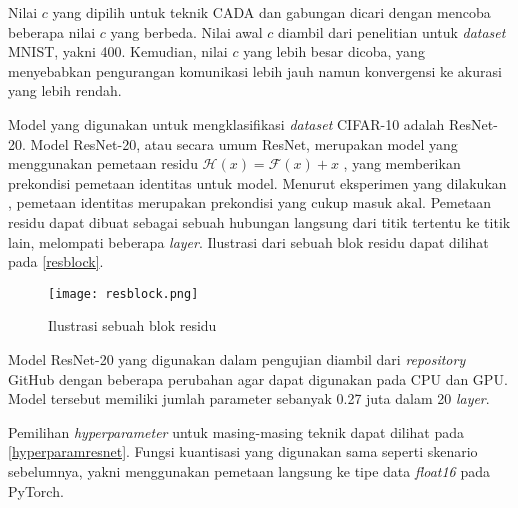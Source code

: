 Nilai $c$ yang dipilih untuk teknik CADA dan gabungan dicari dengan mencoba beberapa nilai $c$ yang berbeda. Nilai awal $c$ diambil dari penelitian \textcite{Chen2021CADA} untuk \emph{dataset} MNIST, yakni 400. Kemudian, nilai $c$ yang lebih besar dicoba, yang menyebabkan pengurangan komunikasi lebih jauh namun konvergensi ke akurasi yang lebih rendah.


Model yang digunakan untuk mengklasifikasi \emph{dataset} CIFAR-10 adalah ResNet-20. Model ResNet-20, atau secara umum ResNet, merupakan model yang menggunakan pemetaan residu $\mathcal{H}(x) = \mathcal{F}(x) + x$ \parencite{he2015deep}, yang memberikan prekondisi pemetaan identitas untuk model. Menurut eksperimen yang dilakukan \textcite{he2015deep}, pemetaan identitas merupakan prekondisi yang cukup masuk akal. Pemetaan residu dapat dibuat sebagai sebuah hubungan langsung dari titik tertentu ke titik lain, melompati beberapa \emph{layer}. Ilustrasi dari sebuah blok residu dapat dilihat pada \autoref{resblock}.

\begin{figure}[htb]
  \centering
  \texttt{[image: resblock.png]}
  \caption{Ilustrasi sebuah blok residu \parencite{he2015deep}}\label{resblock}
\end{figure}

Model ResNet-20 yang digunakan dalam pengujian diambil dari \emph{repository} GitHub \cite{Idelbayev18a} dengan beberapa perubahan agar dapat digunakan pada CPU dan GPU. Model tersebut memiliki jumlah parameter sebanyak 0.27 juta dalam 20 \emph{layer}.

Pemilihan \emph{hyperparameter} untuk masing-masing teknik dapat dilihat pada \autoref{hyperparamresnet}. Fungsi kuantisasi yang digunakan sama seperti skenario sebelumnya, yakni menggunakan pemetaan langsung ke tipe data \emph{float16} pada PyTorch.

